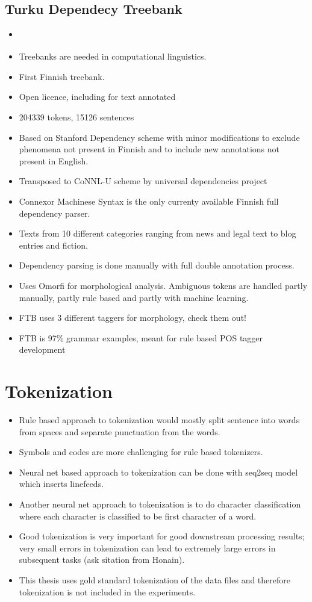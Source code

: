\documentclass[12pt,a4paper,english
]{tutthesis}
\begin{document}
\subsection{Turku Dependecy Treebank}
\begin{itemize}
\item \cite{Haverinen2014}
\item Treebanks are needed in computational linguistics.
\item First Finnish treebank.
\item Open licence, including for text annotated
\item 204339 tokens, 15126 sentences
\item Based on Stanford Dependency scheme with minor modifications to exclude phenomena not present in Finnish and to include new annotations not present in English.
\item Transposed to CoNNL-U scheme by universal dependencies project
\item Connexor Machinese Syntax is the only currenty available Finnish full dependency parser.
\item Texts from 10 different categories ranging from news and legal text to blog entries and fiction.
\item Dependency parsing is done manually with full double annotation process.
\item Uses Omorfi for morphological analysis. Ambiguous tokens are handled partly manually, partly rule based and partly with machine learning.
\item FTB uses 3 different taggers for morphology, check them out!
\item FTB is 97\% grammar examples, meant for rule based POS tagger development
\end{itemize}

\section{Tokenization}
\begin{itemize}
\item Rule based approach to tokenization would mostly split sentence into words from spaces and separate punctuation from the words.
\item Symbols and codes are more challenging for rule based tokenizers.
\item Neural net based approach to tokenization can be done with seq2seq model which inserts linefeeds.
\item Another neural net approach to tokenization is to do character classification where each character is classified to be first character of a word.
\item Good tokenization is very important for good downstream processing results; very small errors in tokenization can lead to extremely large errors in subsequent tasks (ask sitation from Honain). 
\item This thesis uses gold standard tokenization of the data files and therefore tokenization is not included in the experiments. 
\end{itemize}
\end{document}
